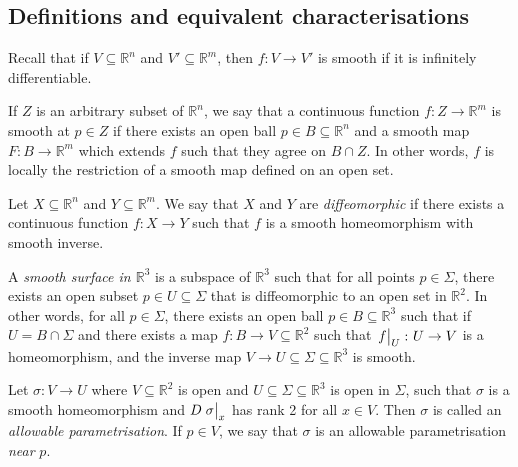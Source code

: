 \subsection{Definitions and equivalent characterisations}
Recall that if \( V \subseteq \mathbb R^n \) and \( V' \subseteq \mathbb R^m \), then \( f \colon V \to V' \) is smooth if it is infinitely differentiable.
\begin{definition}
	If \( Z \) is an arbitrary subset of \( \mathbb R^n \), we say that a continuous function \( f \colon Z \to \mathbb R^m \) is smooth at \( p \in Z \) if there exists an open ball \( p \in B \subseteq \mathbb R^n \) and a smooth map \( F \colon B \to \mathbb R^m \) which extends \( f \) such that they agree on \( B \cap Z \).
	In other words, \( f \) is locally the restriction of a smooth map defined on an open set.
\end{definition}
\begin{definition}
	Let \( X \subseteq \mathbb R^n \) and \( Y \subseteq \mathbb R^m \).
	We say that \( X \) and \( Y \) are \textit{diffeomorphic} if there exists a continuous function \( f \colon X \to Y \) such that \( f \) is a smooth homeomorphism with smooth inverse.
\end{definition}
\begin{definition}
	A \textit{smooth surface in \( \mathbb R^3 \)} is a subspace of \( \mathbb R^3 \) such that for all points \( p \in \Sigma \), there exists an open subset \( p \in U \subseteq \Sigma \) that is diffeomorphic to an open set in \( \mathbb R^2 \).
	In other words, for all \( p \in \Sigma \), there exists an open ball \( p \in B \subseteq \mathbb R^3 \) such that if \( U = B \cap \Sigma \) and there exists a map \( f \colon B \to V \subseteq \mathbb R^2 \) such that \( \eval{f}_U \colon U \to V \) is a homeomorphism, and the inverse map \( V \to U \subseteq \Sigma \subseteq \mathbb R^3 \) is smooth.
\end{definition}
\begin{definition}
	Let \( \sigma \colon V \to U \) where \( V \subseteq \mathbb R^2 \) is open and \( U \subseteq \Sigma \subseteq \mathbb R^3 \) is open in \( \Sigma \), such that \( \sigma \) is a smooth homeomorphism and \( D \eval{\sigma}_x \) has rank 2 for all \( x \in V \).
	Then \( \sigma \) is called an \textit{allowable parametrisation}.
	If \( p \in V \), we say that \( \sigma \) is an allowable parametrisation \textit{near} \( p \).
\end{definition}
